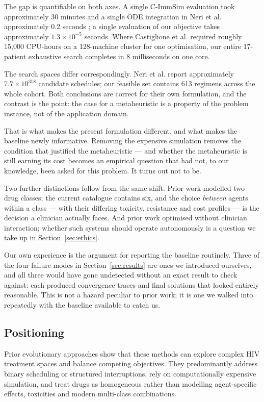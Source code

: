 \documentclass[conference]{IEEEtran}
\begin{document}
The gap is quantifiable on both axes. A single C-ImmSim evaluation took approximately 30 minutes \cite{castiglione2007} and a single ODE integration in Neri et al. approximately 0.2 seconds \cite{neri2007tcbb}; a single evaluation of our objective takes approximately $1.3 \times 10^{-5}$ seconds. Where Castiglione et al. required roughly 15,000 CPU-hours on a 128-machine cluster for one optimisation, our entire 17-patient exhaustive search completes in 8 milliseconds on one core.

The search spaces differ correspondingly. Neri et al. report approximately $7.7 \times 10^{318}$ candidate schedules; our feasible set contains 613 regimens across the whole cohort. Both conclusions are correct for their own formulation, and the contrast is the point: the case for a metaheuristic is a property of the problem instance, not of the application domain.

That is what makes the present formulation different, and what makes the baseline newly informative. Removing the expensive simulation removes the condition that justified the metaheuristic --- and whether the metaheuristic is still earning its cost becomes an empirical question that had not, to our knowledge, been asked for this problem. It turns out not to be.

Two further distinctions follow from the same shift. Prior work modelled two drug classes; the current catalogue contains six, and the choice \textit{between} agents within a class --- with their differing toxicity, resistance and cost profiles --- is the decision a clinician actually faces. And prior work optimised without clinician interaction; whether such systems should operate autonomously is a question we take up in Section~\ref{sec:ethics}.

Our own experience is the argument for reporting the baseline routinely. Three of the four failure modes in Section~\ref{sec:results} are ones we introduced ourselves, and all three would have gone undetected without an exact result to check against: each produced convergence traces and final solutions that looked entirely reasonable. This is not a hazard peculiar to prior work; it is one we walked into repeatedly with the baseline available to catch us.

\subsection{Positioning}\label{sec:rw-pos}

Prior evolutionary approaches show that these methods can explore complex HIV treatment spaces and balance competing objectives. They predominantly address binary scheduling or structured interruptions, rely on computationally expensive simulation, and treat drugs as homogeneous rather than modelling agent-specific effects, toxicities and modern multi-class combinations.
\end{document}
